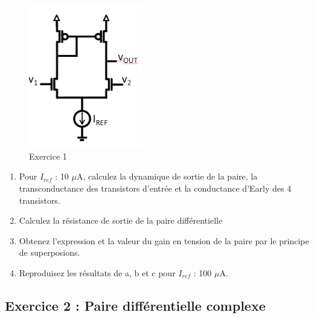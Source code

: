 \documentclass[paper=a4, fontsize=11pt]{article} %
\numberwithin{equation}{section} %
\numberwithin{figure}{section} %
\numberwithin{table}{section} %
\begin{document}
\begin{figure}[!htbp]
   \centering
   \includegraphics[width=5cm]{figure/fig11-1.png}
   \caption{Exercice 1}
   \label{fig11-1}
\end{figure}

\begin{enumerate}
\item  Pour $I_{ref}$ : 10 $\mu$A, calculez la dynamique de sortie de la paire, la transconductance des transistors d'entrée et la conductance d'Early des 4 transistors.
\item  Calculez la résistance de sortie de la paire différentielle
\item  Obtenez l'expression et la valeur du gain en tension de la paire par le principe de superposions.
\item  Reproduisez les résultats de a, b et c pour $I_{ref}$ : 100 $\mu$A.
\end{enumerate}

\subsection*{Exercice 2 : Paire différentielle complexe}
\end{document}
